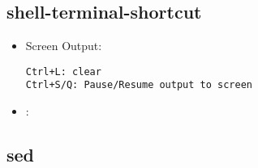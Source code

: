 \subsection{shell-terminal-shortcut}
\begin{itemize}
\item Screen Output:
\begin{lstlisting}
Ctrl+L: clear
Ctrl+S/Q: Pause/Resume output to screen
\end{lstlisting}
\item {}:
\end{itemize}

\subsection{sed}

